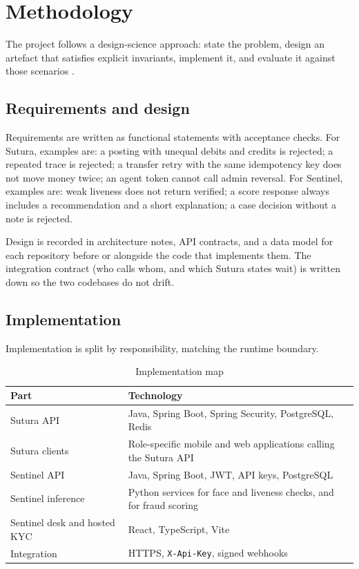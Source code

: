 \documentclass[12pt,a4paper]{article}
\begin{document}
\section{Methodology}

The project follows a design-science approach: state the problem, design an artefact that satisfies explicit invariants, implement it, and evaluate it against those scenarios \cite{hevner2004}.

\subsection{Requirements and design}

Requirements are written as functional statements with acceptance checks. For Sutura, examples are: a posting with unequal debits and credits is rejected; a repeated trace is rejected; a transfer retry with the same idempotency key does not move money twice; an agent token cannot call admin reversal. For Sentinel, examples are: weak liveness does not return verified; a score response always includes a recommendation and a short explanation; a case decision without a note is rejected.

Design is recorded in architecture notes, API contracts, and a data model for each repository before or alongside the code that implements them. The integration contract (who calls whom, and which Sutura states wait) is written down so the two codebases do not drift.

\subsection{Implementation}

Implementation is split by responsibility, matching the runtime boundary.

\begin{table}[ht]
\centering
\caption{Implementation map}
\label{tab:stack}
\small
\begin{tabularx}{\textwidth}{@{}l X@{}}
\toprule
\textbf{Part} & \textbf{Technology} \\
\midrule
Sutura API & Java, Spring Boot, Spring Security, PostgreSQL, Redis \\
Sutura clients & Role-specific mobile and web applications calling the Sutura API \\
Sentinel API & Java, Spring Boot, JWT, API keys, PostgreSQL \\
Sentinel inference & Python services for face and liveness checks, and for fraud scoring \\
Sentinel desk and hosted KYC & React, TypeScript, Vite \\
Integration & HTTPS, \texttt{X-Api-Key}, signed webhooks \\
\bottomrule
\end{tabularx}
\end{table}
\end{document}
